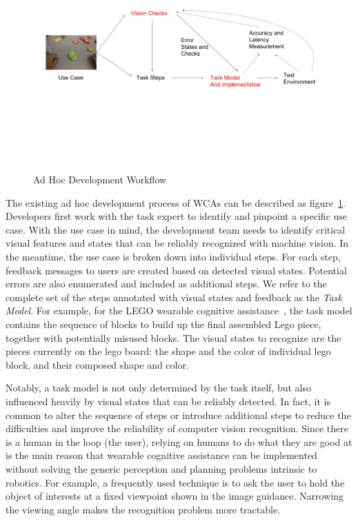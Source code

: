 \begin{figure}
  \centering
  \includegraphics[trim={0 6cm 0 0},width=\linewidth]{FIGS/ad-hoc-workflow}
	\caption{Ad Hoc Development Workflow}
    \label{figs:workflow}
\end{figure}

The existing ad hoc development process of WCAs can be described as
figure~\ref{figs:workflow}. Developers first work with the task expert to
identify and pinpoint a specific use case. With the use case in mind, the
development team needs to identify critical visual features and states that can
be reliably recognized with machine vision. In the meantime, the use case is
broken down into individual steps. For each step, feedback messages to users are
created based on detected visual states. Potential errors are also enumerated
and included as additional steps. We refer to the complete set of the steps
annotated with visual states and feedback as the \textit{Task Model}. For
example, for the LEGO wearable cognitive assistance~\cite{chen2017empirical},
the task model contains the sequence of blocks to build up the final assembled
Lego piece, together with potentially misused blocks. The visual states to
recognize are the pieces currently on the lego board: the shape and the color of
individual lego block, and their composed shape and color.

Notably, a task model is not only determined by the task itself, but also
influenced heavily by visual states that can be reliably detected. In fact, it
is common to alter the sequence of steps or introduce additional steps to reduce
the difficulties and improve the reliability of computer vision recognition.
Since there is a human in the loop (the user), relying on humans to do what they
are good at is the main reason that wearable cognitive assistance can be
implemented without solving the generic perception and planning problems
intrinsic to robotics. For example, a frequently used technique is to ask the
user to hold the object of interests at a fixed viewpoint shown in the image
guidance. Narrowing the viewing angle makes the recognition problem more
tractable.

